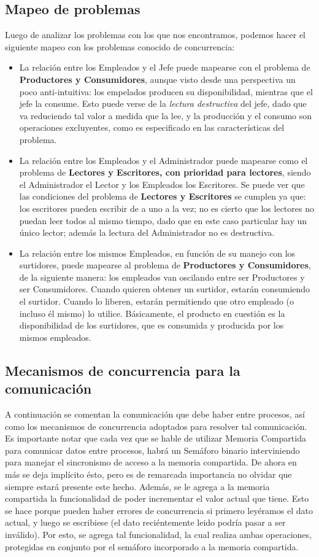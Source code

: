 \documentclass[a4paper,12pt]{article}
\begin{document}
\subsection{Mapeo de problemas}
Luego de analizar los problemas con los que nos encontramos, podemos hacer el siguiente mapeo con los problemas conocido de concurrencia:
\begin{itemize}
	\item La relación entre los Empleados y el Jefe puede mapearse con el problema de \textbf{Productores y Consumidores}, aunque visto desde una perspectiva un poco anti-intuitiva: los empelados producen su disponibilidad, mientras que el jefe la consume. Esto puede verse de la \textit{lectura destructiva} del jefe, dado que va reduciendo tal valor a medida que la lee, y la producción y el consumo son operaciones excluyentes, como es especificado en las características del problema.
	\item La relación entre los Empleados y el Administrador puede mapearse como el problema de \textbf{Lectores y Escritores, con prioridad para lectores}, siendo el Administrador el Lector y los Empleados los Escritores. Se puede ver que las condiciones del problema de \textbf{Lectores y Escritores} se cumplen ya que: los escritores pueden escribir de a uno a la vez; no es cierto que los lectores no puedan leer todos al mismo tiempo, dado que en este caso particular hay un único lector; además la lectura del Administrador no es destructiva.
	\item La relación entre los mismos Empleados, en función de su manejo con los surtidores, puede mapearse al problema de \textbf{Productores y Consumidores}, de la siguiente manera: los empleados van oscilando entre ser Productores y ser Consumidores. Cuando quieren obtener un surtidor, estarán consumiendo el surtidor. Cuando lo liberen, estarán permitiendo que otro empleado (o incluso él mismo) lo utilice. Básicamente, el producto en cuestión es la disponibilidad de los surtidores, que es consumida y producida por los mismos empleados.
\end{itemize}


\subsection{Mecanismos de concurrencia para la comunicación}
A continuación se comentan la comunicación que debe haber entre procesos, así como los mecanismos de concurrencia adoptados para resolver tal comunicación.
Es importante notar que cada vez que se hable de utilizar Memoria Compartida para comunicar datos entre procesos, habrá un Semáforo binario interviniendo para manejar el sincronismo de acceso a la memoria compartida. De ahora en más se deja implícito ésto, pero es de remarcada importancia no olvidar que siempre estará presente este hecho. Además, se le agrega a la memoria compartida la funcionalidad de poder incrementar el valor actual que tiene. Esto se hace porque pueden haber errores de concurrencia si primero leyéramos el dato actual, y luego se escribiese (el dato reciéntemente leido podría pasar a ser inválido). Por esto, se agrega tal funcionalidad, la cual realiza ambas operaciones, protegidas en conjunto por el semáforo incorporado a la memoria compartida. 
\end{document}
